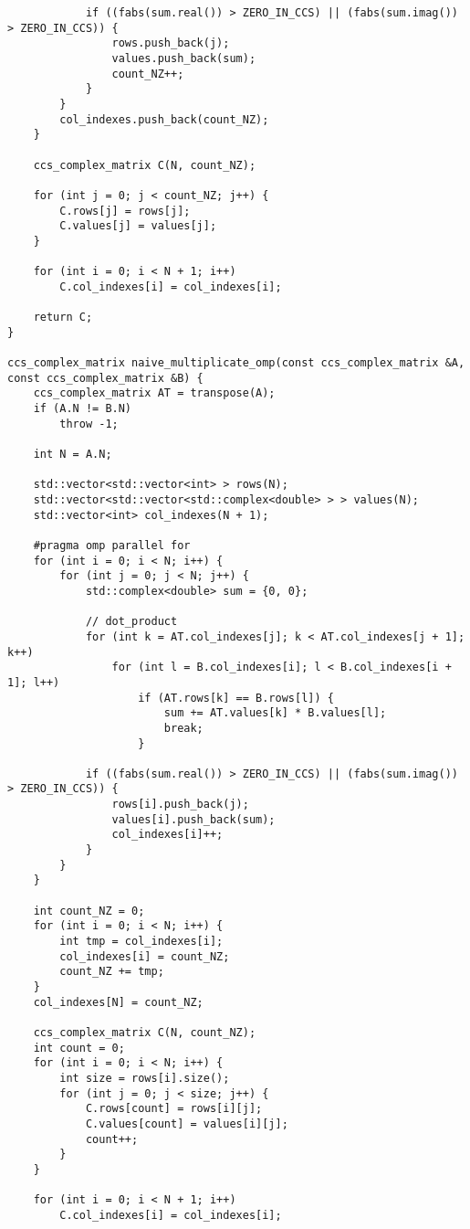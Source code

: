 \documentclass{report}
\begin{document}
\begin{lstlisting}
            if ((fabs(sum.real()) > ZERO_IN_CCS) || (fabs(sum.imag()) > ZERO_IN_CCS)) {
                rows.push_back(j);
                values.push_back(sum);
                count_NZ++;
            }
        }
        col_indexes.push_back(count_NZ);
    }

    ccs_complex_matrix C(N, count_NZ);

    for (int j = 0; j < count_NZ; j++) {
        C.rows[j] = rows[j];
        C.values[j] = values[j];
    }

    for (int i = 0; i < N + 1; i++)
        C.col_indexes[i] = col_indexes[i];

    return C;
}

ccs_complex_matrix naive_multiplicate_omp(const ccs_complex_matrix &A, const ccs_complex_matrix &B) {
    ccs_complex_matrix AT = transpose(A);
    if (A.N != B.N)
        throw -1;

    int N = A.N;

    std::vector<std::vector<int> > rows(N);
    std::vector<std::vector<std::complex<double> > > values(N);
    std::vector<int> col_indexes(N + 1);

    #pragma omp parallel for
    for (int i = 0; i < N; i++) {
        for (int j = 0; j < N; j++) {
            std::complex<double> sum = {0, 0};

            // dot_product
            for (int k = AT.col_indexes[j]; k < AT.col_indexes[j + 1]; k++)
                for (int l = B.col_indexes[i]; l < B.col_indexes[i + 1]; l++)
                    if (AT.rows[k] == B.rows[l]) {
                        sum += AT.values[k] * B.values[l];
                        break;
                    }

            if ((fabs(sum.real()) > ZERO_IN_CCS) || (fabs(sum.imag()) > ZERO_IN_CCS)) {
                rows[i].push_back(j);
                values[i].push_back(sum);
                col_indexes[i]++;
            }
        }
    }

    int count_NZ = 0;
    for (int i = 0; i < N; i++) {
        int tmp = col_indexes[i];
        col_indexes[i] = count_NZ;
        count_NZ += tmp;
    }
    col_indexes[N] = count_NZ;

    ccs_complex_matrix C(N, count_NZ);
    int count = 0;
    for (int i = 0; i < N; i++) {
        int size = rows[i].size();
        for (int j = 0; j < size; j++) {
            C.rows[count] = rows[i][j];
            C.values[count] = values[i][j];
            count++;
        }
    }

    for (int i = 0; i < N + 1; i++)
        C.col_indexes[i] = col_indexes[i];


\end{lstlisting}
\end{document}
